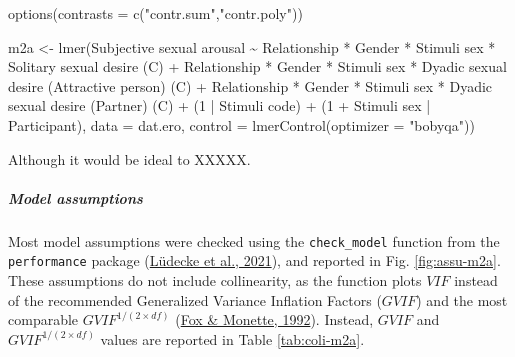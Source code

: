 \documentclass[
  bookmarksnumbered]{article}
\newenvironment{Shaded}{\begin{snugshade}}{\end{snugshade}}
\newcommand{\AttributeTok}[1]{\textcolor[rgb]{0.80,0.80,0.80}{#1}}
\newcommand{\DecValTok}[1]{\textcolor[rgb]{0.86,0.86,0.80}{#1}}
\newcommand{\FunctionTok}[1]{\textcolor[rgb]{0.94,0.94,0.56}{#1}}
\newcommand{\NormalTok}[1]{\textcolor[rgb]{0.80,0.80,0.80}{#1}}
\newcommand{\OtherTok}[1]{\textcolor[rgb]{0.94,0.94,0.56}{#1}}
\newcommand{\SpecialCharTok}[1]{\textcolor[rgb]{0.86,0.64,0.64}{#1}}
\newcommand{\StringTok}[1]{\textcolor[rgb]{0.80,0.58,0.58}{#1}}
\begin{document}
\begin{Shaded}
\begin{Highlighting}[]
\FunctionTok{options}\NormalTok{(}\AttributeTok{contrasts =} \FunctionTok{c}\NormalTok{(}\StringTok{"contr.sum"}\NormalTok{,}\StringTok{"contr.poly"}\NormalTok{))}

\NormalTok{m2a }\OtherTok{\textless{}{-}} \FunctionTok{lmer}\NormalTok{(}\StringTok{\textasciigrave{}}\AttributeTok{Subjective sexual arousal}\StringTok{\textasciigrave{}} \SpecialCharTok{\textasciitilde{}}
\NormalTok{            Relationship }\SpecialCharTok{*}\NormalTok{ Gender }\SpecialCharTok{*} \StringTok{\textasciigrave{}}\AttributeTok{Stimuli sex}\StringTok{\textasciigrave{}} \SpecialCharTok{*} \StringTok{\textasciigrave{}}\AttributeTok{Solitary sexual desire (C)}\StringTok{\textasciigrave{}} \SpecialCharTok{+}
\NormalTok{            Relationship }\SpecialCharTok{*}\NormalTok{ Gender }\SpecialCharTok{*} \StringTok{\textasciigrave{}}\AttributeTok{Stimuli sex}\StringTok{\textasciigrave{}} \SpecialCharTok{*} \StringTok{\textasciigrave{}}\AttributeTok{Dyadic sexual desire (Attractive person) (C)}\StringTok{\textasciigrave{}} \SpecialCharTok{+}
\NormalTok{            Relationship }\SpecialCharTok{*}\NormalTok{ Gender }\SpecialCharTok{*} \StringTok{\textasciigrave{}}\AttributeTok{Stimuli sex}\StringTok{\textasciigrave{}} \SpecialCharTok{*} \StringTok{\textasciigrave{}}\AttributeTok{Dyadic sexual desire (Partner) (C)}\StringTok{\textasciigrave{}} \SpecialCharTok{+}
\NormalTok{            (}\DecValTok{1} \SpecialCharTok{|} \StringTok{\textasciigrave{}}\AttributeTok{Stimuli code}\StringTok{\textasciigrave{}}\NormalTok{) }\SpecialCharTok{+}
\NormalTok{            (}\DecValTok{1} \SpecialCharTok{+} \StringTok{\textasciigrave{}}\AttributeTok{Stimuli sex}\StringTok{\textasciigrave{}} \SpecialCharTok{|}\NormalTok{ Participant),}
           \AttributeTok{data =}\NormalTok{ dat.ero,}
           \AttributeTok{control =} \FunctionTok{lmerControl}\NormalTok{(}\AttributeTok{optimizer =} \StringTok{"bobyqa"}\NormalTok{))}
\end{Highlighting}
\end{Shaded}

Although it would be ideal to XXXXX.

\hypertarget{model-assumptions-1}{%
\subparagraph{Model assumptions}\label{model-assumptions-1}}

Most model assumptions were checked using the \texttt{check\_model} function from the \texttt{performance} package (\protect\hyperlink{ref-ludecke2021}{Lüdecke et al., 2021}), and reported in Fig. \ref{fig:assu-m2a}. These assumptions do not include collinearity, as the function plots \(VIF\) instead of the recommended Generalized Variance Inflation Factors (\(GVIF\)) and the most comparable \(GVIF^{{1}/{(2 \times df)}}\) (\protect\hyperlink{ref-fox1992}{Fox \& Monette, 1992}). Instead, \(GVIF\) and \(GVIF^{{1}/{(2 \times df)}}\) values are reported in Table \ref{tab:coli-m2a}.
\end{document}
